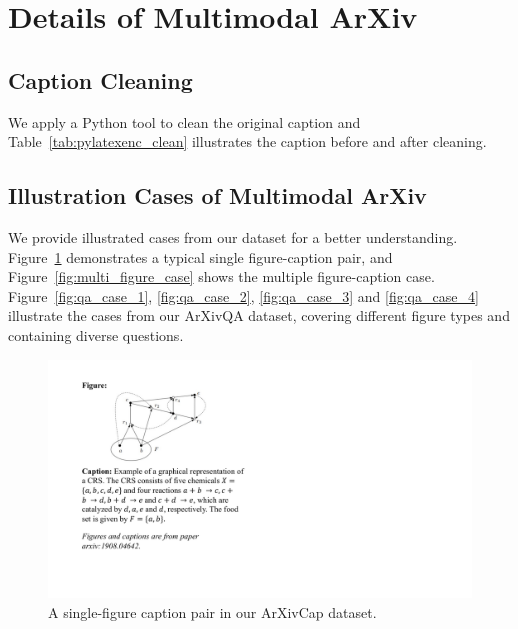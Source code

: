 \appendix

\section{Details of Multimodal ArXiv}
\label{apx:arxiv_cap}


\subsection{Caption Cleaning}
\label{apx:caption_clean}

We apply a Python tool to clean the original caption and Table~\ref{tab:pylatexenc_clean} illustrates the caption before and after cleaning. 



\subsection{Illustration Cases of Multimodal ArXiv}
\label{apx:case_illustrations}
We provide illustrated cases from our dataset for a better understanding.
Figure~\ref{fig:single_figure_pair} demonstrates a typical single figure-caption pair, and Figure~\ref{fig:multi_figure_case} shows the multiple figure-caption case.
Figure~\ref{fig:qa_case_1}, \ref{fig:qa_case_2}, \ref{fig:qa_case_3} and \ref{fig:qa_case_4} illustrate the cases from our ArXivQA dataset, covering different figure types and containing diverse questions.



\begin{figure}[htb!]
    \centering
    \includegraphics[width=\linewidth]{figs/single-figure-v2.pdf}
    \caption{A single-figure caption pair in our ArXivCap dataset.}
\label{fig:single_figure_pair}
\end{figure}


